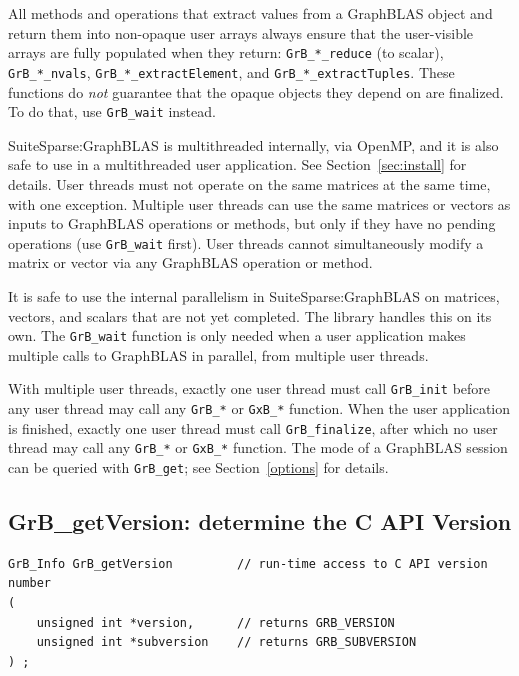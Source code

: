 All methods and operations that extract values from a GraphBLAS object and
return them into non-opaque user arrays always ensure that the user-visible
arrays are fully populated when they return: \verb'GrB_*_reduce' (to scalar),
\verb'GrB_*_nvals', \verb'GrB_*_extractElement', and
\verb'GrB_*_extractTuples'.  These functions do {\em not} guarantee that the
opaque objects they depend on are finalized.  To do that, use
\verb'GrB_wait' instead.

SuiteSparse:GraphBLAS is multithreaded internally, via OpenMP, and it is also
safe to use in a multithreaded user application.  See Section~\ref{sec:install}
for details.
User threads must not operate on the same matrices at the same time, with one
exception.  Multiple user threads can use the same matrices or vectors as
inputs to GraphBLAS operations or methods, but only if they have no
pending operations (use \verb'GrB_wait'
first).  User threads cannot simultaneously modify a matrix or vector via any
GraphBLAS operation or method.

It is safe to use the internal parallelism in SuiteSparse:GraphBLAS on
matrices, vectors, and scalars that are not yet completed.  The library
handles this on its own.  The \verb'GrB_wait' function is only
needed when a user application makes multiple calls to GraphBLAS in parallel,
from multiple user threads.

With multiple user threads, exactly one user thread must call \verb'GrB_init'
before any user thread may call any \verb'GrB_*' or \verb'GxB_*' function.
When the user application is finished, exactly one user thread must call
\verb'GrB_finalize', after which no user thread may call any \verb'GrB_*' or
\verb'GxB_*' function.
The mode of a GraphBLAS session can be queried with \verb'GrB_get';
see Section~\ref{options} for details.

\subsection{{\sf GrB\_getVersion:} determine the C API Version} %
\label{getVersion}

\begin{mdframed}[userdefinedwidth=6in]
{\footnotesize
\begin{verbatim}
GrB_Info GrB_getVersion         // run-time access to C API version number
(
    unsigned int *version,      // returns GRB_VERSION
    unsigned int *subversion    // returns GRB_SUBVERSION
) ;
\end{verbatim}
}\end{mdframed}


